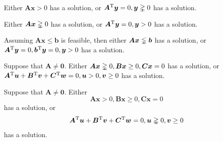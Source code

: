 \begin{theorem}[Gordan]
Either $\bm A\bm x>0$ has a solution, or $\bm A^{\mathrm T}\bm y=0,\bm y\gvertneqq0$ has a solution.
\end{theorem}

\begin{theorem}[Stiemke]
Either $\bm A\bm x\gvertneqq0$ has a solution, or $\bm A^{\mathrm T}\bm y=0,\bm y>0$ has a solution.
\end{theorem}

\begin{theorem}[Gale]
Assuming $\bm A\bm x\le\bm b$ is feasible, then either $\bm A\bm x\lvertneqq\bm b$ has a solution, or $\bm A^{\mathrm T}\bm y=0,\bm b^{\mathrm T}\bm y=0,\bm y>0$ has a solution.
\end{theorem}

\begin{theorem}[Tucker]
Suppose that $\bm A\ne\bm0$. Either 
$\bm A\bm x\gvertneqq0,\bm B\bm x\ge0,\bm C\bm x=0$ has a solution,
or $\bm A^{\mathrm T}\bm u+\bm B^{\mathrm T}\bm v+\bm C^{\mathrm T}\bm w=0,\bm u>0,\bm v\ge0$
has a solution.
\end{theorem}

\begin{theorem}[Motzkin]
Suppose that $\bm A\ne\bm0$. Either 
\[
\bm{Ax}>0,\bm B\bm x\ge0,\bm C\bm x=0
\]
has a solution, or
\[
\bm A^{\mathrm T}\bm u+\bm B^{\mathrm T}\bm v+\bm C^{\mathrm T}\bm w=0,
\bm u\gvertneqq0,
\bm v\ge0
\]
has a solution.
\end{theorem}






















